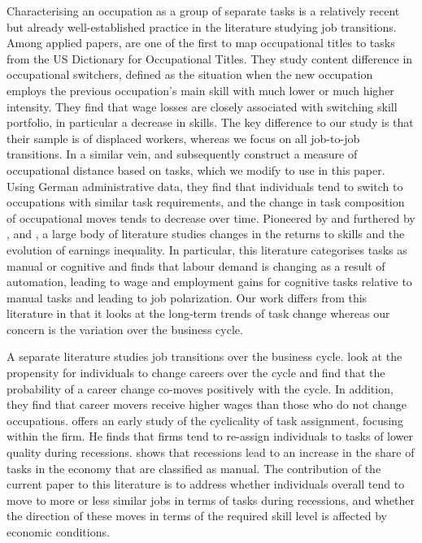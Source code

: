 \documentclass[12pt,authoryear]{elsarticle}
\begin{document}
	Characterising an occupation as a group of separate tasks is a relatively recent but already well-established practice in the literature studying job transitions. Among applied papers, \cite{Poletaev2008} are one of the first to map occupational titles to tasks from the US Dictionary for Occupational Titles. %
	They study content difference in occupational switchers, defined as the situation when the new occupation employs the previous occupation's main skill with much lower or much higher intensity. They find that wage losses are closely associated with switching skill portfolio, in particular a decrease in skills. The key difference to our study is that their sample is of displaced workers, whereas we focus on all job-to-job transitions. %
	In a similar vein, \cite{Gathmann2010} and subsequently \cite{robinson2018} construct a measure of occupational distance based on tasks, which we modify to use in this paper. Using German administrative data, they find that individuals tend to switch to occupations with similar task requirements, and the change in task composition of occupational moves tends to decrease over time.  Pioneered by \cite{ALM2003} and furthered by \cite{AcemogluAutor2011}, \cite{AutorDorn2013}  and \cite{GoosManningSalomons2014}, a large body of literature studies changes in the returns to skills and the evolution of earnings inequality. In particular, this literature categorises tasks as manual or cognitive and finds that labour demand is changing as a result of automation, leading to wage and employment gains for cognitive tasks relative to manual tasks and leading to job polarization. Our work differs from this literature in that it looks at the long-term trends of task change whereas our concern is the variation over the business cycle.
	
	\vspace{2mm}
	
	
	
	
	
	\vspace{2mm}
	
	
	A separate literature studies job transitions over the business cycle. \cite{Carrillo-Tudela2016} look at the propensity for individuals to change careers over the cycle and find that the probability of a career change co-moves positively with the cycle. In addition, they find that career movers receive higher wages than those who do not change occupations. \cite{Devereux2000} offers an early study of the cyclicality of task assignment, focusing within the firm. He finds that firms tend to re-assign individuals to tasks of lower quality during recessions. \cite{Summerfield2016} shows that recessions lead to an increase in the share of tasks in the economy that are classified as manual. The contribution of the current paper to this literature is to address whether individuals overall tend to move to more or less similar jobs in terms of tasks during recessions, and whether the direction of these moves in terms of the required skill level is affected by economic conditions.
	
\end{document}
